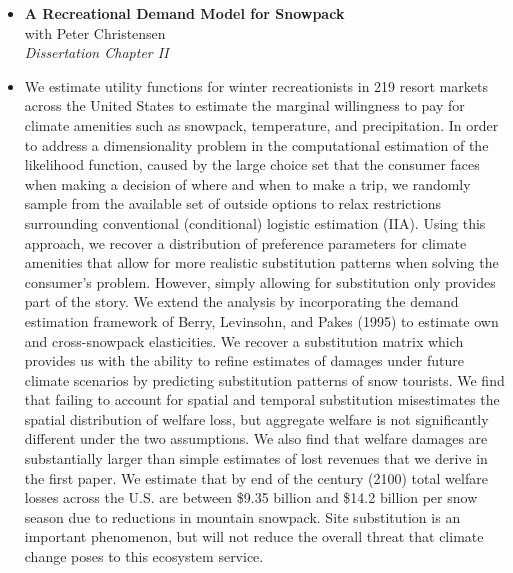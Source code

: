 \documentclass[11pt]{article}
\newenvironment{abstracts}[2]{%
  \begin{list}{}{%
    \setlength{\topsep}{0pt}%
    \setlength{\leftmargin}{#1}%
    \setlength{\rightmargin}{#2}%
    \setlength{\listparindent}{\parindent}%
    \setlength{\itemindent}{\parindent}%
    \setlength{\parsep}{\parskip}%
  }%
  \item[]}{\end{list}}
\begin{document}
\begin{abstracts}{-1.5in}{0in}
{\begin{itemize}
    \item[] \textbf{A Recreational Demand Model for Snowpack} \\
    with Peter Christensen \\
    \textit{Dissertation Chapter II}
    \item[] We estimate utility functions for winter recreationists in 219 resort markets across the United States to estimate the marginal willingness to pay for climate amenities such as snowpack, temperature, and precipitation. In order to address a dimensionality problem in the computational estimation of the likelihood function, caused by the large choice set that the consumer faces when making a decision of where and when to make a trip, we randomly sample from the available set of outside options to relax restrictions surrounding conventional (conditional) logistic estimation (IIA). Using this approach, we recover a distribution of preference parameters for climate amenities that allow for more realistic substitution patterns when solving the consumer's problem. However, simply allowing for substitution only provides part of the story. We extend the analysis by incorporating the demand estimation framework of Berry, Levinsohn, and Pakes (1995) to estimate own and cross-snowpack elasticities. We recover a substitution matrix which provides us with the ability to refine estimates of damages under future climate scenarios by predicting substitution patterns of snow tourists. We find that failing to account for spatial and temporal substitution misestimates the spatial distribution of welfare loss, but aggregate welfare is not significantly different under the two assumptions. We also find that welfare damages are substantially larger than simple estimates of lost revenues that we derive in the first paper. We estimate that by end of the century (2100) total welfare losses across the U.S. are between \$9.35 billion and \$14.2 billion per snow season due to reductions in mountain snowpack. Site substitution is an important phenomenon, but will not reduce the overall threat that climate change poses to this ecosystem service.
    
\vfill
    

\end{itemize}}
\end{abstracts}
\end{document}
